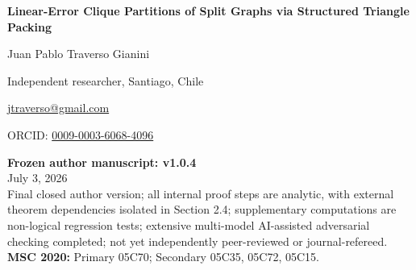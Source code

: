 \documentclass[11pt,a4paper]{article}
\newcommand{\statusblock}{%
\begin{center}
\small
\textbf{Frozen author manuscript: v1.0.4}\\
July 3, 2026\\
Final closed author version; all internal proof steps are analytic, with external theorem dependencies isolated in Section 2.4; supplementary computations are non-logical regression tests; extensive multi-model AI-assisted adversarial checking completed; not yet independently peer-reviewed or journal-refereed.\\[0.4em]
\textbf{MSC 2020:} Primary 05C70; Secondary 05C35, 05C72, 05C15.
\end{center}}
\begin{document}
\begin{titlepage}
\centering
\vspace*{2.2cm}
{\sffamily\bfseries\fontsize{22}{27}\selectfont Linear-Error Clique Partitions of Split Graphs via Structured Triangle Packing\par}
\vspace{1.5cm}
{\Large Juan Pablo Traverso Gianini\par}
\vspace{0.35cm}
{\normalsize Independent researcher, Santiago, Chile\par}
\vspace{0.2cm}
{\normalsize \href{mailto:jtraverso@gmail.com}{jtraverso@gmail.com}\par}
{\normalsize ORCID: \href{https://orcid.org/0009-0003-6068-4096}{0009-0003-6068-4096}\par}
\vfill
\statusblock
\vfill
\end{titlepage}
\setcounter{page}{1}
\begin{abstract}
Let \(G=(K\cup I,E)\) be a split graph on \(n\) vertices, with \(K\) a clique and \(I\) an independent set. We prove that there is an absolute constant \(C\) such that

\[
|E(G)|-2\nu_3(G)
\le
\frac{n^2}{6}+Cn,
\]

where \(\nu_3(G)\) is the maximum number of pairwise edge-disjoint triangles in \(G\). Consequently,

\[
\operatorname{cp}(G)
\le
\frac{n^2}{6}+Cn
\]

for every split graph \(G\), where \(\operatorname{cp}(G)\) is the minimum number of cliques whose edge sets partition \(E(G)\). This strengthens the asymptotic \((1/6+o(1))n^2\) bound to the correct linear-error scale. The leading constant is sharp.

The proof separates three regimes according to \(\alpha=|I|/|K|\). In the bulk regime, an exact four-orbit linear program for a common-neighborhood profile yields a uniform quadratic fractional margin; the Haxell--Rödl theorem then absorbs the subquadratic integrality loss. When \(\alpha\to0\), large edge-disjoint matchings anchored at the independent vertices leave an almost complete, triangle-divisible clique residual, which is decomposed exactly by dense graph decomposition results. When \(\alpha\to2\), averaged factorization closes the short corridor, while a double-factor polarization inequality and a shifted-center gain-completion argument close the remaining mesoscopic corridor.

The proof does not establish the stronger universal estimate \(\nu_3^*(G)-\nu_3(G)=O(n)\). Away from the extremal corridor, a potentially superlinear integrality gap is absorbed by quadratic fractional slack.

\medskip
\noindent\textbf{Keywords:} clique partition; split graph; triangle packing; fractional packing; factorization; polarization; list edge coloring; graph decomposition.
\end{abstract}
\vspace{0.8em}
\end{document}
